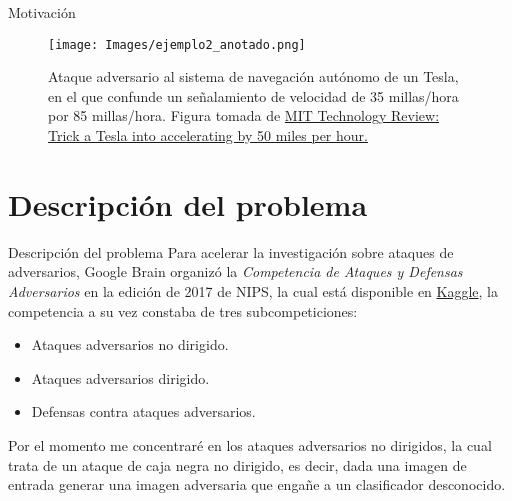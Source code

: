 \documentclass[10pt]{beamer}
\begin{document}
\begin{frame}{Motivación}
\justify
\small

\begin{figure}
\centering
\texttt{[image: Images/ejemplo2\_anotado.png]}
\caption{Ataque adversario al sistema de navegación autónomo de un Tesla, en el que confunde un señalamiento de velocidad de 35 millas/hora por 85 millas/hora. Figura tomada de \href{https://www.technologyreview.com/2020/02/19/868188/hackers-can-trick-a-tesla-into-accelerating-by-50-miles-per-hour/}{MIT Technology Review: Trick a Tesla into accelerating by 50 miles per hour.}}
\end{figure}

\end{frame}

\section{Descripción del problema}
\begin{frame}{Descripción del problema}
\justify
\small
Para acelerar la investigación sobre ataques de adversarios, Google Brain organizó la  \emph{Competencia de Ataques y Defensas Adversarios} en la edición de 2017 de NIPS, la cual está disponible en \href{https://www.kaggle.com/c/nips-2017-non-targeted-adversarial-attack/overview}{Kaggle}, la competencia a su vez constaba de tres subcompeticiones:

\begin{itemize}
\item Ataques adversarios no dirigido.
\item Ataques adversarios dirigido.
\item Defensas contra ataques adversarios.
\end{itemize}

Por el momento me concentraré en los ataques adversarios no dirigidos, la cual trata de un ataque de caja negra no dirigido, es decir, dada una imagen de entrada generar una imagen adversaria que engañe a un clasificador desconocido.

\end{frame}
\end{document}
